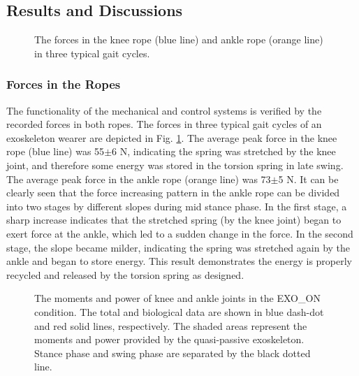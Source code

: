 \documentclass[10pt]{asme2ej}
\begin{document}
\subsection{Results and Discussions}

\begin{figure}[b]
	\caption{The forces in the knee rope (blue line) and ankle rope (orange line) in three typical gait cycles.}
	\label{fig:force}
\end{figure}

\subsubsection{Forces in the Ropes}
The functionality of the mechanical and control systems is verified by the recorded forces in both ropes.
The forces in three typical gait cycles of an exoskeleton wearer are depicted in Fig. \ref{fig:force}.
The average peak force in the knee rope (blue line) was 55$\pm$6 N, indicating the spring was stretched by the knee joint, and therefore some energy was stored in the torsion spring in late swing.
The average peak force in the ankle rope (orange line) was 73$\pm$5 N.
It can be clearly seen that the force increasing pattern in the ankle rope can be divided into two stages by different slopes during mid stance phase.
In the first stage, a sharp increase indicates that the stretched spring (by the knee joint) began to exert force at the ankle, which led to a sudden change in the force.
In the second stage, the slope became milder, indicating the spring was stretched again by the ankle and began to store energy.
This result demonstrates the energy is properly recycled and released by the torsion spring as designed.

\begin{figure*}[t]
	\caption{The moments and power of knee and ankle joints in the EXO\_ON condition.
	The total and biological data are shown in blue dash-dot and red solid lines, respectively.
	The shaded areas represent the moments and power provided by the quasi-passive exoskeleton.
	Stance phase and swing phase are separated by the black dotted line.}
	\label{fig:exo}
\end{figure*}
\end{document}
